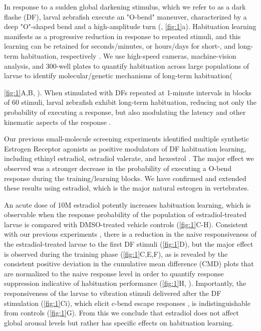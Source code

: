 \documentclass[10pt,lineno]{RandlettLab_elife}
\begin{document}
\begin{figure}
\begin{fullwidth}
\begin{center}
\label{fig:1}

\end{center}
\end{fullwidth}
\end{figure}

In response to a sudden global darkening stimulus, which we refer to as a dark flashe (DF), larval zebrafish execute an "O-bend" maneuver, characterized by a deep "O"-shaped bend and a high-amplitude turn (\citealp{Burgess2007}, \autoref{fig:1}a). 
Habituation learning manifests as a progressive reduction in response to repeated stimuli, and this learning can be retained for seconds/minutes, or hours/days for short-, and long-term habituation, respectively \citep{Rankin2009-no}. 
We use high-speed cameras, machine-vision analysis, and 300-well plates to quantify habituation across large populations of larvae to identify molecular/genetic mechanisms of long-term habituation({\autoref{fig:1}A,B, \citealp{Randlett2019-fj,Lamire2023-he}). 
When stimulated with DFs repeated at 1-minute intervals in blocks of 60 stimuli, larval zebrafish exhibit long-term habituation, reducing not only the probability of executing a response, but also modulating the latency and other kinematic aspects of the response \citep{Randlett2019-fj}.  


Our previous small-molecule screening experiments identified multiple synthetic Estrogen Receptor agonists as positive modulators of DF habituation learning, including ethinyl estradiol, estradiol valerate, and hexestrol  \citep{Lamire2023-he}. 
The major effect we observed was a stronger decrease in the probability of executing a O-bend response during the training/learning blocks. 
We have confirmed and extended these results using estradiol, which is the major natural estrogen in vertebrates. 

An acute dose of 10\textmu M estradiol potently increases habituation learning, which is observable when the response probability of the population of estradiol-treated larvae is compared with DMSO-treated vehicle controls (\autoref{fig:1}C-H).
Consistent with our previous experiments \citep{Lamire2023-he}, there is a reduction in the naive responsiveness of the estradiol-treated larvae to the first DF stimuli (\autoref{fig:1}D), but the major effect is observed during the training phase (\autoref{fig:1}C,E,F), as is revealed by the consistent positive deviation in the cumulative mean difference (CMD) plots that are normalized to the naive response level in order to quantify response suppression indicative of habituation performance (\autoref{fig:1}H, \citealp{Randlett2019-fj}).
Importantly, the responsiveness of the larvae to vibration stimuli delivered after the DF stimulation (\autoref{fig:1}Ci), which elicit c-bend escape responses \citep{Kimmel1974-jh}, is indistinguishable from controls (\autoref{fig:1}G). From this we conclude that estradiol does not affect global arousal levels but rather has specific effects on habituation learning. 

}
\end{document}

